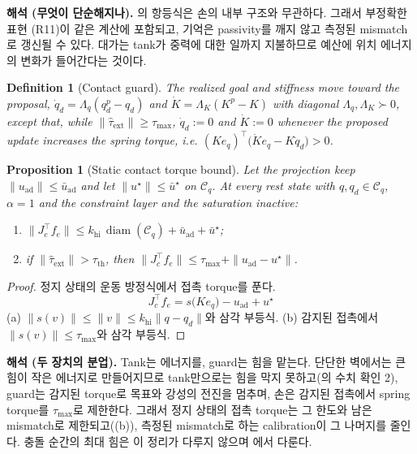 \documentclass[11pt]{article}\usepackage[margin=1in]{geometry}\usepackage{amsmath,amssymb,amsthm,mathtools}\usepackage{graphicx}\graphicspath{{figures/}{../figures/}{figs/}{./}}\usepackage{enumitem}\usepackage{hyperref}\usepackage{cleveref}\usepackage{tikz}\usetikzlibrary{arrows.meta,positioning,calc,shapes.geometric}\usepackage{float}\usepackage{rotating}\usepackage[most]{tcolorbox}\usepackage{kotex}\usepackage{booktabs}\usepackage{longtable}\emergencystretch=1.6em\tolerance=2000 \crefname{assumption}{Assumption}{Assumptions}\Crefname{assumption}{Assumption}{Assumptions}\crefname{definition}{Definition}{Definitions}\Crefname{definition}{Definition}{Definitions}\crefname{proposition}{Proposition}{Propositions}\Crefname{proposition}{Proposition}{Propositions}\crefname{fact}{Fact}{Facts}\Crefname{fact}{Fact}{Facts} \newtheorem{assumption}{Assumption}\newtheorem{definition}{Definition}\newtheorem{lemma}{Lemma}\newtheorem{proposition}{Proposition}\newtheorem{theorem}{Theorem}\newtheorem{corollary}{Corollary}\newtheorem{fact}{Fact}\theoremstyle{remark}\newtheorem{remark}{Remark} \newcommand{\R}{\mathbb{R}}\newcommand{\xb}{\bar x}\newcommand{\Ab}{\bar A}\newcommand{\By}{\bar B_y}\newcommand{\U}{\mathcal U}\newcommand{\Z}{\mathcal Z}
\begin{document}
\textbf{해석 (무엇이 단순해지나).} 의 항등식은 손의 내부 구조와 무관하다. 그래서 부정확한 표현 (R11)이 같은 계산에 포함되고, 기억은 passivity를 깨지 않고 측정된 mismatch로 갱신될 수 있다. 대가는 tank가 중력에 대한 일까지 지불하므로 예산에 위치 에너지의 변화가 들어간다는 것이다.

\begin{definition}[Contact guard]
\label{def:guard}
The realized goal and stiffness move toward the proposal, $\dot q_d=\Lambda_q(q_d^p-q_d)$ and $\dot K=\Lambda_K(K^p-K)$ with diagonal $\Lambda_q,\Lambda_K\succ0$, except that, while $\|\hat\tau_{\mathrm{ext}}\|\ge\tau_{\max}$, $\dot q_d:=0$ and $\dot K:=0$ whenever the proposed update increases the spring torque, i.e. $(Ke_q)^\top\big(\dot K e_q-K\dot q_d\big)>0$.
\end{definition}

\begin{proposition}[Static contact torque bound]
\label{prop:static}
Let the projection keep $\|u_{\mathrm{ad}}\|\le\bar u_{\mathrm{ad}}$ and let $\|u^\star\|\le\bar u^\star$ on $\mathcal C_q$. At every rest state with $q,q_d\in\mathcal C_q$, $\alpha=1$ and the constraint layer and the saturation inactive:
\begin{enumerate}[label=(\alph*)]
\item $\big\|J_c^\top f_e\big\|\le k_{\mathrm{hi}}\,\operatorname{diam}(\mathcal C_q)+\bar u_{\mathrm{ad}}+\bar u^\star$;
\item if $\|\hat\tau_{\mathrm{ext}}\|>\tau_{\mathrm{th}}$, then $\big\|J_c^\top f_e\big\|\le\tau_{\max}+\|u_{\mathrm{ad}}-u^\star\|$.
\end{enumerate}
\end{proposition}

\begin{proof}
정지 상태의 운동 방정식에서 접촉 torque를 푼다.
\[
J_c^\top f_e=s\big(Ke_q\big)-u_{\mathrm{ad}}+u^\star
\]
(a) $\|s(v)\|\le\|v\|\le k_{\mathrm{hi}}\|q-q_d\|$와 삼각 부등식. (b) 감지된 접촉에서 $\|s(v)\|\le\tau_{\max}$와 삼각 부등식.
\end{proof}

\textbf{해석 (두 장치의 분업).} Tank는 에너지를, guard는 힘을 맡는다. 단단한 벽에서는 큰 힘이 작은 에너지로 만들어지므로 tank만으로는 힘을 막지 못하고(의 수치 확인 2), guard는 감지된 torque로 목표와 강성의 전진을 멈추며, 손은 감지된 접촉에서 spring torque를 $\tau_{\max}$로 제한한다. 그래서 정지 상태의 접촉 torque는 그 한도와 남은 mismatch로 제한되고((b)), 측정된 mismatch로 하는 calibration이 그 나머지를 줄인다. 충돌 순간의 최대 힘은 이 정리가 다루지 않으며 에서 다룬다.
\end{document}
